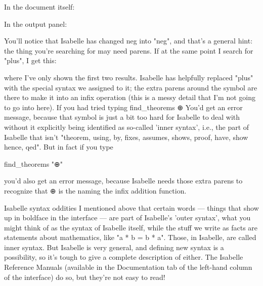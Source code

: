 In the document itself:

In the output panel:
 

You'll notice that Isabelle has changed neg into "neg", and that's a general hint: the thing you're searching for may need parens. If at the same point I search for "plus", I get this:

where I've only shown the first two results. Isabelle has helpfully replaced "plus" with the special syntax we assigned to it; the extra parens around the symbol are there to make it into an infix operation (this is a messy detail that I'm not going to go into here). If you had tried typing
find_theorems  ⊕
You'd get an error message, because that symbol is just a bit too hard for Isabelle to deal with without it explicitly being identified as so-called 'inner syntax', i.e., the part of Isabelle that isn't "theorem, using, by, fixes, assumes, shows, proof, have, show hence, qed". But in fact if you type 

find_theorems "⊕"

you'd also get an error message, because Isabelle needs those extra parens to recognize that ⊕ is the naming the infix addition function. 

Isabelle syntax oddities
I mentioned above that certain words --- things that show up in boldface in the interface --- are part of Isabelle's 'outer syntax', what you might think of as the syntax of Isabelle itself, while the stuff we write as facts are statements about mathematics, like "a * b = b * a". Those, in Isabelle, are called inner syntax. But Isabelle is very general, and defining new syntax is a possibility, so it's tough to give a complete description of either. The Isabelle Reference Manuals (available in the Documentation tab of the left-hand column of the interface) do so, but they're not easy to read! 

